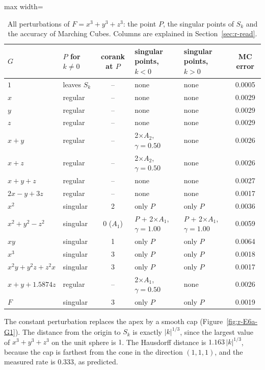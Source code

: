 \documentclass[12pt, a4paper, oneside]{book}
\theoremstyle{plain}
\theoremstyle{definition}
\theoremstyle{remark}
\theoremstyle{definition}
\begin{document}
\begin{table}[!h]
\centering
\footnotesize
\begin{adjustbox}{max width=\textwidth}
\begin{tabular}{l l c l l c}
\toprule
$G$ & $P$ for $k\neq0$ & corank at $P$ & singular points, $k<0$ & singular points, $k>0$ & MC error \\
\midrule
$1$ & leaves $S_k$ & -- & none & none & 0.0005 \\
$x$ & regular & -- & none & none & 0.0029 \\
$y$ & regular & -- & none & none & 0.0029 \\
$z$ & regular & -- & none & none & 0.0029 \\
$x+y$ & regular & -- & 2$\times$$A_2$, $\gamma=0.50$ & none & 0.0026 \\
$x+z$ & regular & -- & 2$\times$$A_2$, $\gamma=0.50$ & none & 0.0026 \\
$x+y+z$ & regular & -- & none & none & 0.0027 \\
$2x-y+3z$ & regular & -- & none & none & 0.0017 \\
$x^2$ & singular & 2 & only $P$ & only $P$ & 0.0036 \\
$x^2+y^2-z^2$ & singular & 0 ($A_1$) & $P$ + 2$\times$$A_1$, $\gamma=1.00$ & $P$ + 2$\times$$A_1$, $\gamma=1.00$ & 0.0059 \\
$xy$ & singular & 1 & only $P$ & only $P$ & 0.0064 \\
$x^3$ & singular & 3 & only $P$ & only $P$ & 0.0018 \\
$x^2y+y^2z+z^2x$ & singular & 3 & only $P$ & only $P$ & 0.0017 \\
$x+y+1.5874z$ & regular & -- & 2$\times$$A_1$, $\gamma=0.50$ & none & 0.0026 \\
$F$ & singular & 3 & only $P$ & only $P$ & 0.0019 \\
\bottomrule
\end{tabular}
\end{adjustbox}
\caption[Singular points for $x^3+y^3+z^3$]{All perturbations of $F=x^3+y^3+z^3$: the point $P$, the singular points of $S_k$ and the accuracy of Marching Cubes. Columns are explained in Section~\ref{sec:r-read}.}
\label{tab:r-E6a-points}
\end{table}

The constant perturbation replaces the apex by a smooth cap (Figure~\ref{fig:r-E6a-G1}). The distance from the origin to $S_k$ is exactly $|k|^{1/3}$, since the largest value of $x^3+y^3+z^3$ on the unit sphere is $1$. The Hausdorff distance is $1.163\,|k|^{1/3}$, because the cap is farthest from the cone in the direction $(1,1,1)$, and the measured rate is $0.333$, as predicted.
\end{document}
